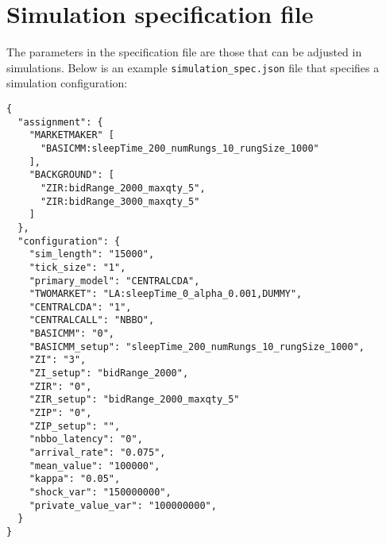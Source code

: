 \documentclass[11pt]{article}
\begin{document}
\section{Simulation specification file}

The parameters in the specification file are those that can be adjusted in simulations. Below is an example \verb|simulation_spec.json| file that specifies a simulation configuration:

\begin{verbatim}
{
  "assignment": {
    "MARKETMAKER" [
      "BASICMM:sleepTime_200_numRungs_10_rungSize_1000"
    ],
    "BACKGROUND": [
      "ZIR:bidRange_2000_maxqty_5",
      "ZIR:bidRange_3000_maxqty_5"
    ]
  },
  "configuration": {
    "sim_length": "15000",
    "tick_size": "1",
    "primary_model": "CENTRALCDA",
    "TWOMARKET": "LA:sleepTime_0_alpha_0.001,DUMMY",
    "CENTRALCDA": "1",
    "CENTRALCALL": "NBBO",
    "BASICMM": "0",
    "BASICMM_setup": "sleepTime_200_numRungs_10_rungSize_1000",
    "ZI": "3",
    "ZI_setup": "bidRange_2000",
    "ZIR": "0",
    "ZIR_setup": "bidRange_2000_maxqty_5"
    "ZIP": "0",
    "ZIP_setup": "",
    "nbbo_latency": "0",
    "arrival_rate": "0.075",
    "mean_value": "100000",
    "kappa": "0.05",
    "shock_var": "150000000",
    "private_value_var": "100000000",
  }
}
\end{verbatim}
\end{document}
